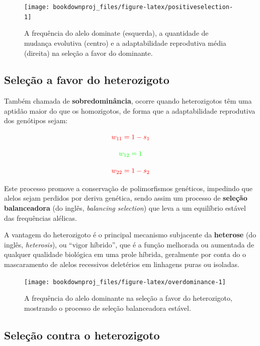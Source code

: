 \documentclass[
]{book}
\begin{document}
\begin{figure}

{\centering \texttt{[image: bookdownproj\_files/figure-latex/positiveselection-1]} 

}

\caption{A frequência  do alelo dominate (esquerda), a quantidade de mudança evolutiva (centro) e a adaptabilidade reprodutiva média (direita) na seleção a favor do dominante.}\label{fig:positiveselection}
\end{figure}

\hypertarget{seleuxe7uxe3o-a-favor-do-heterozigoto}{%
\subsection{Seleção a favor do heterozigoto}\label{seleuxe7uxe3o-a-favor-do-heterozigoto}}

Também chamada de \textbf{sobredominância}, ocorre quando heterozigotos têm uma aptidão maior do que os
homozigotos, de forma que a adaptabilidade reprodutiva dos genótipos sejam:

\[ \color{red}{w_{11} = 1-s_1}\]

\[ \color{green}{w_{12} = 1}\]

\[ \color{red}{w_{22} = 1-s_2}\]

Este processo promove a conservação de polimorfismos genéticos, impedindo que alelos sejam perdidos por deriva genética, sendo assim um processo de \textbf{seleção balanceadora} (do inglês, \emph{balancing selection}) que leva a um equilíbrio estável das frequências alélicas.

A vantagem do heterozigoto é o principal mecanismo subjacente da \textbf{heterose} (do inglês, \emph{heterosis}), ou ``vigor híbrido'', que é a função melhorada ou aumentada de qualquer qualidade biológica em uma prole híbrida, geralmente por conta do o mascaramento de alelos recessivos deletérios em linhagens puras ou isoladas.

\begin{figure}

{\centering \texttt{[image: bookdownproj\_files/figure-latex/overdominance-1]} 

}

\caption{A frequência  do alelo dominante na seleção a favor do heterozigoto, mostrando o processo de seleção balanceadora estável.}\label{fig:overdominance}
\end{figure}

\hypertarget{seleuxe7uxe3o-contra-o-heterozigoto}{%
\subsection{Seleção contra o heterozigoto}\label{seleuxe7uxe3o-contra-o-heterozigoto}}
\end{document}
